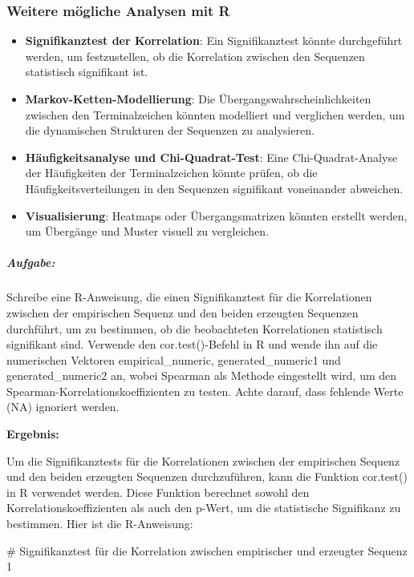 \documentclass[
]{article}
\begin{document}
\subsubsection{\texorpdfstring{\textbf{Weitere mögliche Analysen mit
R}}{Weitere mögliche Analysen mit R}}\label{weitere-muxf6gliche-analysen-mit-r}

\begin{itemize}
\item
  \textbf{Signifikanztest der Korrelation}: Ein Signifikanztest könnte
  durchgeführt werden, um festzustellen, ob die Korrelation zwischen den
  Sequenzen statistisch signifikant ist.
\item
  \textbf{Markov-Ketten-Modellierung}: Die Übergangswahrscheinlichkeiten
  zwischen den Terminalzeichen könnten modelliert und verglichen werden,
  um die dynamischen Strukturen der Sequenzen zu analysieren.
\item
  \textbf{Häufigkeitsanalyse und Chi-Quadrat-Test}: Eine
  Chi-Quadrat-Analyse der Häufigkeiten der Terminalzeichen könnte
  prüfen, ob die Häufigkeitsverteilungen in den Sequenzen signifikant
  voneinander abweichen.
\item
  \textbf{Visualisierung}: Heatmaps oder Übergangsmatrizen könnten
  erstellt werden, um Übergänge und Muster visuell zu vergleichen.
\end{itemize}

\subparagraph{\texorpdfstring{
\textbf{Aufgabe:}}{ Aufgabe:}}\label{aufgabe-3}

Schreibe eine R-Anweisung, die einen Signifikanztest für die
Korrelationen zwischen der empirischen Sequenz und den beiden erzeugten
Sequenzen durchführt, um zu bestimmen, ob die beobachteten Korrelationen
statistisch signifikant sind. Verwende den cor.test()-Befehl in R und
wende ihn auf die numerischen Vektoren empirical\_numeric,
generated\_numeric1 und generated\_numeric2 an, wobei Spearman als
Methode eingestellt wird, um den Spearman-Korrelationskoeffizienten zu
testen. Achte darauf, dass fehlende Werte (NA) ignoriert werden.

\textbf{Ergebnis:}

Um die Signifikanztests für die Korrelationen zwischen der empirischen
Sequenz und den beiden erzeugten Sequenzen durchzuführen, kann die
Funktion cor.test() in R verwendet werden. Diese Funktion berechnet
sowohl den Korrelationskoeffizienten als auch den p-Wert, um die
statistische Signifikanz zu bestimmen. Hier ist die R-Anweisung:

\# Signifikanztest für die Korrelation zwischen empirischer und
erzeugter Sequenz 1
\end{document}
